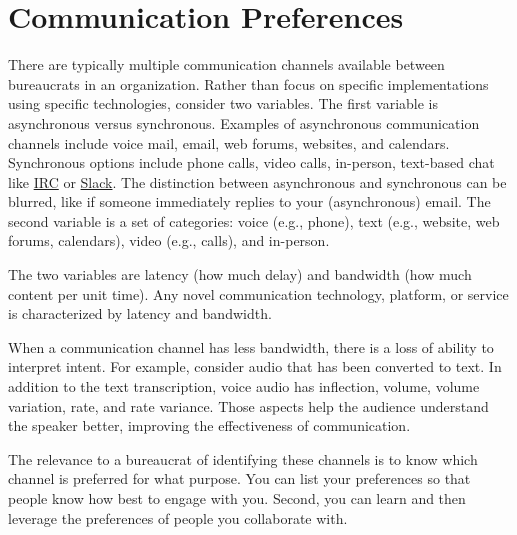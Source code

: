 \section{Communication Preferences\label{sec:communication-preferences}}

There are typically multiple communication channels available between bureaucrats in an organization. Rather than focus on specific implementations using specific technologies, consider two variables. The first variable is asynchronous versus synchronous. Examples of asynchronous communication channels include voice mail, email, web forums, websites, and calendars. Synchronous options include phone calls, video calls, in-person, text-based chat like \href{https://en.wikipedia.org/wiki/Internet_Relay_Chat}{IRC}
or \href{https://en.wikipedia.org/wiki/Slack_(software)}{Slack}.  
The distinction between asynchronous and synchronous can be blurred, like if someone immediately replies to your (asynchronous) email.  The second variable is a set of categories: voice (e.g., phone), text (e.g., website, web forums, calendars), video (e.g., calls), and in-person. 

The two variables are  latency (how much delay) and bandwidth (how much content per unit time). Any novel communication technology, platform, or service is characterized by latency and bandwidth. 

When a communication channel has less bandwidth, there is a loss of ability to interpret intent. 
For example, consider audio that has been converted to text. In addition to the text transcription, voice audio  has inflection, volume, volume variation, rate, and rate variance. Those aspects help the audience understand the speaker better, improving the effectiveness of communication.

The relevance to a bureaucrat of identifying these channels is to know which channel is preferred for what purpose.  You can list your preferences so that people know how best to engage with you.
%
%
Second, you can learn and then leverage the preferences of people you collaborate with.
%
%

